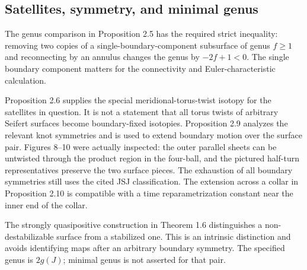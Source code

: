 \documentclass[10pt]{article}
\begin{document}
\subsection*{Satellites, symmetry, and minimal genus}
The genus comparison in Proposition 2.5 has the required strict inequality: removing two copies of a single-boundary-component subsurface of genus \(f\geq1\) and reconnecting by an annulus changes the genus by \(-2f+1<0\). The single boundary component matters for the connectivity and Euler-characteristic calculation.\par
Proposition 2.6 supplies the special meridional-torus-twist isotopy for the satellites in question. It is not a statement that all torus twists of arbitrary Seifert surfaces become boundary-fixed isotopies. Proposition 2.9 analyzes the relevant knot symmetries and is used to extend boundary motion over the surface pair. Figures 8–10 were actually inspected: the outer parallel sheets can be untwisted through the product region in the four-ball, and the pictured half-turn representatives preserve the two surface pieces. The exhaustion of all boundary symmetries still uses the cited JSJ classification. The extension across a collar in Proposition 2.10 is compatible with a time reparametrization constant near the inner end of the collar.\par
The strongly quasipositive construction in Theorem 1.6 distinguishes a non-destabilizable surface from a stabilized one. This is an intrinsic distinction and avoids identifying maps after an arbitrary boundary symmetry. The specified genus is \(2g(J)\); minimal genus is not asserted for that pair.\par
\end{document}
